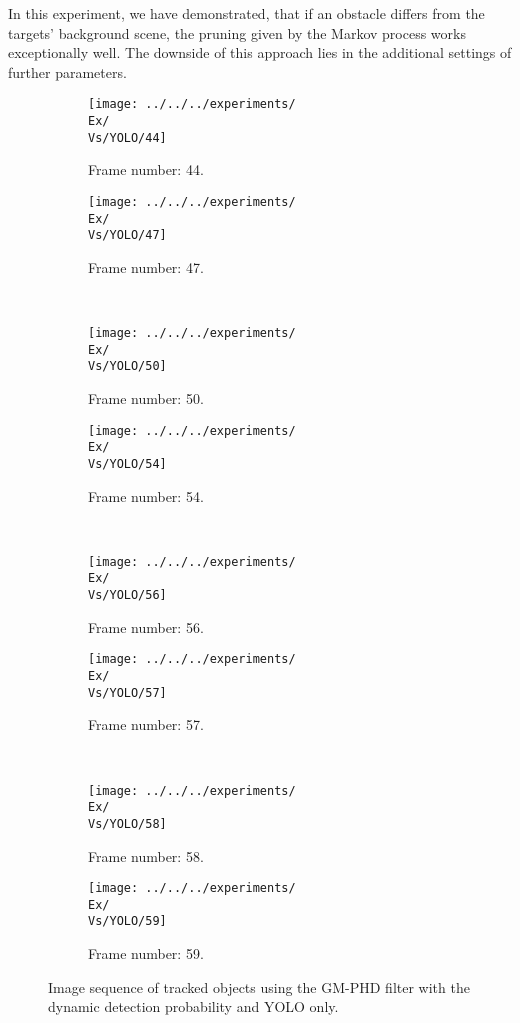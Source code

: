 In this experiment, we have demonstrated, that if an obstacle differs from the targets' background scene, the pruning
given by the Markov process works exceptionally well. The downside of this approach lies in the additional settings of
further parameters.
\begin{figure}[H]
    \centering
    \begin{subfigure}{0.48\textwidth}
        \centering
        \texttt{[image: ../../../experiments/\\Ex/\\Vs/YOLO/44]}
        \caption{Frame number: 44.}
        \label{fig:\Ex-\Vs-\Set:01}
    \end{subfigure}
    \begin{subfigure}{0.48\textwidth}
        \centering
        \texttt{[image: ../../../experiments/\\Ex/\\Vs/YOLO/47]}
        \caption{Frame number: 47.}
        \label{fig:\Ex-\Vs-\Set:02}
    \end{subfigure}
    \\
    \begin{subfigure}{0.48\textwidth}
        \centering
        \texttt{[image: ../../../experiments/\\Ex/\\Vs/YOLO/50]}
        \caption{Frame number: 50.}
        \label{fig:\Ex-\Vs-\Set:03}
    \end{subfigure}
    \begin{subfigure}{0.48\textwidth}
        \centering
        \texttt{[image: ../../../experiments/\\Ex/\\Vs/YOLO/54]}
        \caption{Frame number: 54.}
        \label{fig:\Ex-\Vs-\Set:04}
    \end{subfigure}
    \\
    \begin{subfigure}{0.48\textwidth}
        \centering
        \texttt{[image: ../../../experiments/\\Ex/\\Vs/YOLO/56]}
        \caption{Frame number: 56.}
        \label{fig:\Ex-\Vs-\Set:05}
    \end{subfigure}
    \begin{subfigure}{0.48\textwidth}
        \centering
        \texttt{[image: ../../../experiments/\\Ex/\\Vs/YOLO/57]}
        \caption{Frame number: 57.}
        \label{fig:\Ex-\Vs-\Set:06}
    \end{subfigure}
    \\
    \begin{subfigure}{0.48\textwidth}
        \centering
        \texttt{[image: ../../../experiments/\\Ex/\\Vs/YOLO/58]}
        \caption{Frame number: 58.}
        \label{fig:\Ex-\Vs-\Set:07}
    \end{subfigure}
    \begin{subfigure}{0.48\textwidth}
        \centering
        \texttt{[image: ../../../experiments/\\Ex/\\Vs/YOLO/59]}
        \caption{Frame number: 59.}
        \label{fig:\Ex-\Vs-\Set:08}
    \end{subfigure}
    \caption{Image sequence of tracked objects using the GM-PHD filter with the dynamic detection probability and YOLO only.}
    \label{fig:\Ex-\Vs-\Set}
\end{figure}

